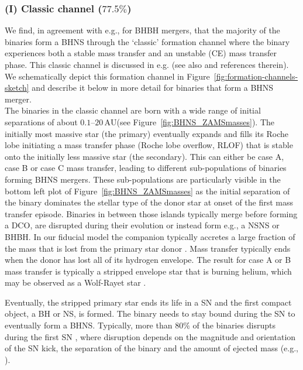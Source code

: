 \documentclass[twocolumn]{aastex63}
\newcommand\bhnsSingle{BHNS\xspace}
\newcommand\PercentageStable{$77.5\%$\xspace}
\newcommand{\AU}{\ensuremath{\,\mathrm{AU}}\xspace}
\begin{document}
 
\subsubsection{(I) Classic channel (\PercentageStable)}
\label{subsubsec:classic-channel}
%
We find, in agreement with e.g., \citet[][]{2019MNRAS.490.3740N} for \ac{BHBH} mergers,  that the majority of the binaries  form a \bhnsSingle through the `classic'  formation channel where the binary experiences both a stable mass transfer and an unstable (CE) mass transfer phase. This classic channel is discussed in e.g. \citet[][]{1991PhR...203....1B,1973A&A....25..387V,2006csxs.book..623T,2008ApJS..174..223B} (see also \citealt{2018arXiv180605820M} and references therein). We schematically depict this formation channel in Figure~\ref{fig:formation-channels-sketch} and  describe it below in more detail for binaries that form a \bhnsSingle merger. \\
 


The binaries in the classic channel are born with a wide range of initial separations  of  about $0.1$--$20$\AU  (see Figure~\ref{fig:BHNS_ZAMSmasses}). The initially most massive star (the primary) eventually expands and fills its Roche lobe initiating a mass transfer phase (Roche lobe overflow, RLOF) that is stable onto the initially less massive star (the secondary). This can either be case A, case B or case C mass transfer, 
leading to different sub-populations of binaries forming \bhnsSingle mergers. These sub-populations are particularly visible in the bottom left plot of Figure~\ref{fig:BHNS_ZAMSmasses} as the initial separation of the binary dominates the stellar type of the donor star at onset of the first mass transfer episode. Binaries in between those islands typically merge  before forming a \ac{DCO}, are disrupted during their evolution or instead form e.g., a \ac{NSNS} or BHBH. 
% 
 In our fiducial model the companion typically accretes a large fraction of   the mass that is lost from the primary star donor \citep[c.f.][]{2015ApJ...805...20S}.  Mass transfer typically ends when the donor has lost all of its hydrogen envelope.  The result for case A or B mass transfer is typically a stripped envelope star that is burning helium, which may be observed as a Wolf-Rayet star \citep{2007ARA&A..45..177C}.

Eventually, the stripped primary star ends its life in a \ac{SN}  and the first compact object, a \ac{BH} or NS, is formed. 
The binary needs to stay bound during the \ac{SN} to eventually form a \bhnsSingle. Typically, more than 80$\%$ of the binaries disrupts during the first \ac{SN} \citep[e.g.][]{2019A&A...624A..66R}, where disruption depends on the magnitude and orientation of the \ac{SN} kick, the separation of the binary and the amount of ejected mass (e.g., \citealt{1975A&A....39...61F,1983ApJ...267..322H,1998A&A...330.1047T,1999A&A...346...91B}).   
 
\end{document}

